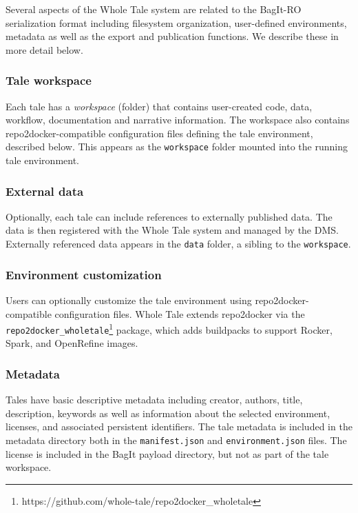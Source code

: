 \documentclass[conference]{IEEEtran}
\begin{document}
Several aspects of the Whole Tale system are related to the BagIt-RO serialization format including filesystem organization, user-defined environments, metadata as well as the export and publication functions. We describe these in more detail below.

\subsubsection{Tale workspace}
Each tale has a \emph{workspace} (folder) that contains user-created code, data, workflow, documentation and narrative information. The workspace also contains repo2docker-compatible configuration files defining the tale environment, described below. This appears as the \texttt{workspace} folder mounted into the running tale environment.

\subsubsection{External data}
Optionally, each tale can include references to externally published data. The data is then registered with the Whole Tale system and managed by the DMS. Externally referenced data appears in the \texttt{data} folder, a sibling to the \texttt{workspace}.

\subsubsection{Environment customization}
Users can optionally customize the tale environment using repo2docker-compatible configuration files. Whole Tale extends repo2docker via the \texttt{repo2docker\_wholetale}\footnote{https://github.com/whole-tale/repo2docker\_wholetale} package, which adds buildpacks to support Rocker, Spark, and OpenRefine images. 

\subsubsection{Metadata}

Tales have basic descriptive metadata including creator, authors, title, description, keywords as well as information about the selected environment, licenses, and associated persistent identifiers. The tale metadata is included in the metadata directory both in the \texttt{manifest.json} and \texttt{environment.json} files.  The license is included in the BagIt payload directory, but not as part of the tale workspace.
\end{document}

